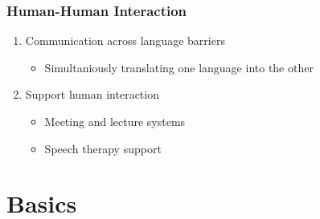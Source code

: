 \subsubsection{Human-Human Interaction}
\begin{enumerate}
\item Communication across language barriers
\begin{itemize}
\item Simultaniously translating one language into the other
\end{itemize}

\item Support human interaction
\begin{itemize}
\item Meeting and lecture systems
\item Speech therapy support

\end{itemize}


\end{enumerate}



\section{Basics}

